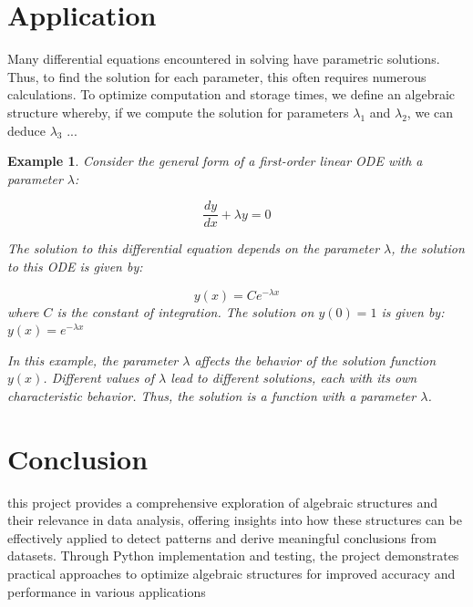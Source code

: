 \documentclass{report}
\newtheorem{Example}{Example}
\begin{document}
            













\section{Application}
Many differential equations encountered 
in solving have parametric solutions.
Thus, to find the solution for each 
parameter, this often requires 
numerous calculations. To optimize 
computation and storage times, we 
define an algebraic structure 
whereby, if we compute the solution 
for parameters $\lambda_1$ and $ \lambda_2 $,
we can deduce $\lambda_3$ ...
\begin{Example}
    Consider the general form of a first-order linear ODE with a parameter $\lambda$:
    
    \[
    \frac{dy}{dx} + \lambda y = 0
    \]
    
    The solution to this differential 
    equation depends on the parameter
    $\lambda$, the solution to this ODE is given by:
    
    \[
    y(x) = C e^{-\lambda x}
    \]
    where $C$ is the constant of integration.
    The solution on $y(0)=1$ is given by:
    $y(x) = e^{-\lambda x}$
    



In this example, the parameter $\lambda$ affects the behavior of the solution function $y(x)$. Different values of $\lambda$ lead to different solutions, each with its own characteristic behavior. Thus, the solution is a function with a parameter $\lambda$.
\end{Example}

\section{Conclusion}
this project provides a comprehensive 
exploration of algebraic structures and
their relevance in data analysis, 
offering insights into how these 
structures can be effectively applied 
to detect patterns and derive meaningful
conclusions from datasets. Through Python 
implementation and testing, the project 
demonstrates practical approaches to 
optimize algebraic structures for 
improved accuracy and performance 
in various applications
    
\end{document}
